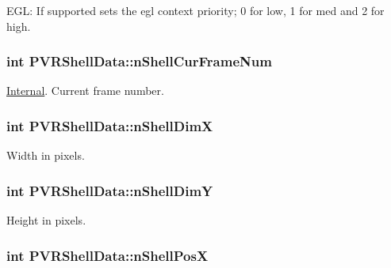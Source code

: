 E\+G\+L\+: If supported sets the egl context priority; 0 for low, 1 for med and 2 for high. \hypertarget{struct_p_v_r_shell_data_afba037b54135c062a74c42a5bd7388dc}{
\subsubsection[{n\+Shell\+Cur\+Frame\+Num}]{\setlength{\rightskip}{0pt plus 5cm}int P\+V\+R\+Shell\+Data\+::n\+Shell\+Cur\+Frame\+Num}}\label{struct_p_v_r_shell_data_afba037b54135c062a74c42a5bd7388dc}
\hyperlink{struct_internal}{Internal}. Current frame number. \hypertarget{struct_p_v_r_shell_data_a98d3c96ed9238ccc0d579693c1c46e93}{
\subsubsection[{n\+Shell\+Dim\+X}]{\setlength{\rightskip}{0pt plus 5cm}int P\+V\+R\+Shell\+Data\+::n\+Shell\+Dim\+X}}\label{struct_p_v_r_shell_data_a98d3c96ed9238ccc0d579693c1c46e93}
Width in pixels. \hypertarget{struct_p_v_r_shell_data_ad554a33b4a399703abaa48d7e75df28e}{
\subsubsection[{n\+Shell\+Dim\+Y}]{\setlength{\rightskip}{0pt plus 5cm}int P\+V\+R\+Shell\+Data\+::n\+Shell\+Dim\+Y}}\label{struct_p_v_r_shell_data_ad554a33b4a399703abaa48d7e75df28e}
Height in pixels. \hypertarget{struct_p_v_r_shell_data_a0961542499b7cd4b12b0956a1fe688aa}{
\subsubsection[{n\+Shell\+Pos\+X}]{\setlength{\rightskip}{0pt plus 5cm}int P\+V\+R\+Shell\+Data\+::n\+Shell\+Pos\+X}}\label{struct_p_v_r_shell_data_a0961542499b7cd4b12b0956a1fe688aa}
